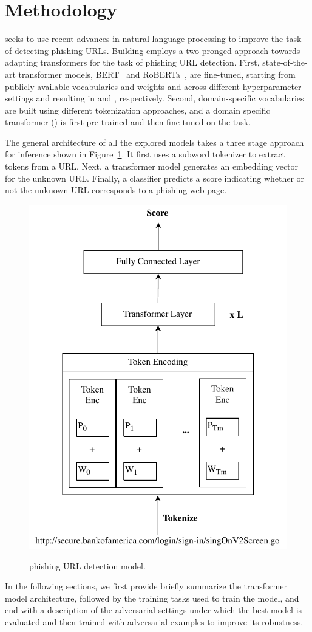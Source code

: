 \section{Methodology}
\label{sec:urltran:method}
%
\URLTranSys seeks to use recent advances in natural language processing to improve the task of detecting phishing URLs.
Building \URLTranSys employs a two-pronged approach towards adapting transformers for the task of phishing URL detection.
First, state-of-the-art transformer models, BERT~\citep{devlin2019bert} and  RoBERTa~\citep{liu2019roberta}, are fine-tuned, starting from publicly available vocabularies and weights and across different hyperparameter settings and resulting in \URLTranSysb and \URLTranSysr, respectively.
Second, domain-specific vocabularies are built using different tokenization approaches, and a domain specific transformer (\URLTranSysc) is first pre-trained and then fine-tuned on the task. 

 The general architecture of all the explored models takes a three stage approach for inference shown in Figure~\ref{fig:urltran:transformer}. It first uses a subword tokenizer to extract tokens from a URL.
Next, a  transformer model generates an embedding vector for the unknown URL.
Finally, a classifier predicts a score indicating whether or not the unknown URL corresponds to a phishing web page.
\begin{figure}
	\centering
	\includegraphics[width=0.4\linewidth,alt={test}]{urltran/figures/TransformerModel}
	\caption{\URLTranSys phishing URL detection model.}
	\label{fig:urltran:transformer}
\end{figure}
In the following sections, we first provide briefly summarize the transformer model architecture, followed by the training tasks used to train the model, and end with a description of the adversarial settings under which the best \URLTranSys model is evaluated and then trained with adversarial examples to improve its robustness.

